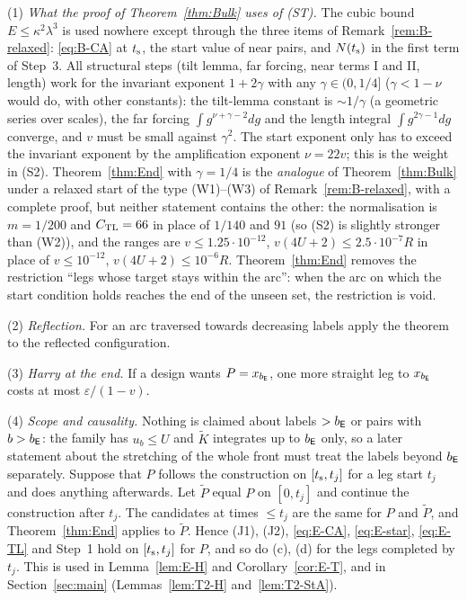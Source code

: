 \begin{remark}\label{rem:E-B}
(1) \emph{What the proof of Theorem~\ref{thm:Bulk} uses of \textup{(ST)}.} The cubic bound $E\le\kappa^2\lambda^3$ is used nowhere
except through the three items of Remark~\ref{rem:B-relaxed}: \eqref{eq:B-CA} at $t_{\mathrm s}$, the start value of near pairs, and $N(t_{\mathrm s})$
in the first term of Step~3. All structural steps (tilt lemma, far forcing, near terms I and II, length) work for the invariant
exponent $1+2\gamma$ with any $\gamma\in(0,1/4]$ ($\gamma<1-\nu$ would do, with other constants): the tilt-lemma constant is
$\sim1/\gamma$ (a geometric series over scales), the far forcing $\int g^{\nu+\gamma-2}dg$ and the length integral
$\int g^{2\gamma-1}dg$ converge, and $v$ must be small against $\gamma^2$. The start exponent only has to exceed the invariant
exponent by the amplification exponent $\nu=22v$; this is the weight in (S2). Theorem~\ref{thm:End} with $\gamma=1/4$ is the
\emph{analogue} of Theorem~\ref{thm:Bulk} under a relaxed start of the type (W1)--(W3) of Remark~\ref{rem:B-relaxed}, with a complete
proof, but neither statement contains the other: the normalisation is $m=1/200$ and $C_{\mathrm{TL}}=66$ in place of $1/140$ and $91$ (so (S2)
is slightly stronger than (W2)), and the ranges are $v\le1.25\cdot10^{-12}$, $v(4U+2)\le2.5\cdot10^{-7}R$ in place of
$v\le10^{-12}$, $v(4U+2)\le10^{-6}R$. Theorem~\ref{thm:End} removes the restriction ``legs whose target stays within the arc'': when
the arc on which the start condition holds reaches the end of the unseen set, the restriction is void.

(2) \emph{Reflection.} For an arc traversed towards decreasing labels apply the theorem to the reflected configuration.

(3) \emph{Harry at the end.} If a design wants $P=x_{b_{\mathsf E}}$, one more straight leg to $x_{b_{\mathsf E}}$ costs at most $\varepsilon/(1-v)$.

(4) \emph{Scope and causality.} Nothing is claimed about labels $>b_{\mathsf E}$ or pairs with $b>b_{\mathsf E}$: the family has $u_b\le U$ and
$\tilde K$ integrates up to $b_{\mathsf E}$ only, so a later statement about the stretching of the whole front must treat the labels beyond
$b_{\mathsf E}$ separately. Suppose that $P$ follows the construction on $[t_{\mathrm s},t_j]$ for a leg start $t_j$ and does anything afterwards.
Let $\tilde P$ equal $P$ on $[0,t_j]$ and continue the construction after $t_j$. The candidates at times $\le t_j$ are the same
for $P$ and $\tilde P$, and Theorem~\ref{thm:End} applies to $\tilde P$. Hence
(J1), (J2), \eqref{eq:E-CA}, \eqref{eq:E-star}, \eqref{eq:E-TL} and Step~1 hold on $[t_{\mathrm s},t_j]$ for $P$, and so do
(c), (d) for the legs completed by $t_j$. This is used in Lemma~\ref{lem:E-H} and Corollary~\ref{cor:E-T}, and in
Section~\ref{sec:main} (Lemmas~\ref{lem:T2-H} and~\ref{lem:T2-StA}).
\end{remark}


